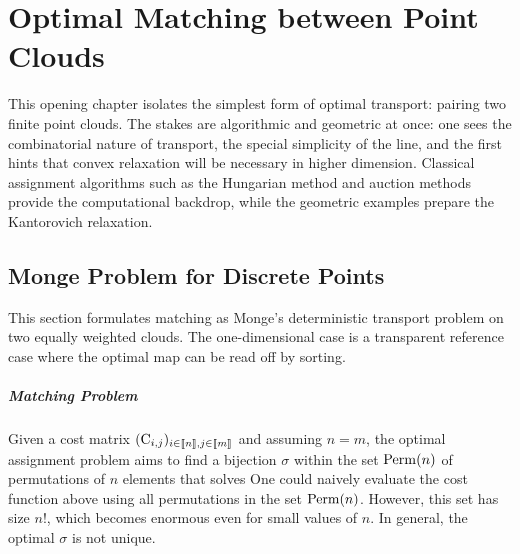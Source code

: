 
\chapter{Optimal Matching between Point Clouds}
\label{sec-matching}

This opening chapter isolates the simplest form of optimal transport: pairing two finite point clouds. The stakes are algorithmic and geometric at once: one sees the combinatorial nature of transport, the special simplicity of the line, and the first hints that convex relaxation will be necessary in higher dimension. Classical assignment algorithms such as the Hungarian method and auction methods~\cite{Kuhn1955,bertsekas1992auction} provide the computational backdrop, while the geometric examples prepare the Kantorovich relaxation.

\section{Monge Problem for Discrete Points}
\label{sec-monge-pbm}

This section formulates matching as Monge's deterministic transport problem on two equally weighted clouds. The one-dimensional case is a transparent reference case where the optimal map can be read off by sorting.

\paragraph{Matching Problem}


Given a cost matrix $(\mathrm{C}_{i,j})_{i \in \llbracket n\rrbracket, j \in \llbracket m\rrbracket}$ and assuming $n=m$, the optimal assignment problem aims to find a bijection $\sigma$ within the set $\mathrm{Perm}(n)$ of permutations of $n$ elements that solves
One could naively evaluate the cost function above using all permutations in the set $\mathrm{Perm}(n)$. However, this set has size $n!$, which becomes enormous even for small values of $n$.
%
In general, the optimal $\sigma$ is not unique.

